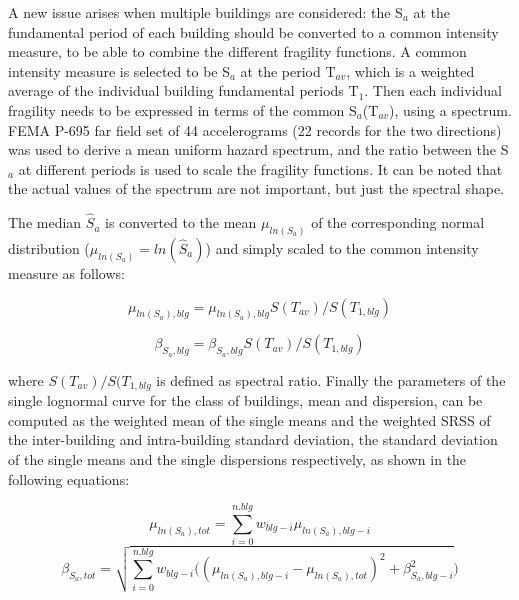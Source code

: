 A new issue arises when multiple buildings are considered: the S$_a$ at the fundamental period of each building should be converted to a common intensity measure, to be able to combine the different fragility functions. A common intensity measure is selected to be S$_a$ at the period T$_{av}$, which is a weighted average of the individual building fundamental periods T$_1$. Then each individual fragility needs to be expressed in terms of the common S$_a$(T$_{av}$), using a spectrum. FEMA P-695 \citep{ATC2007} far field set of 44 accelerograms (22 records for the two directions) was used to derive a mean uniform hazard spectrum, and the ratio between the S$_a$ at different periods is used to scale the fragility functions. It can be noted that the actual values of the spectrum are not important, but just the spectral shape.

The median $\hat{S}_a$ is converted to the mean $\mu_{ln(S_a)}$ of the corresponding normal distribution ($\mu_{ln(S_a)} = ln(\hat{S}_a)$) and simply scaled to the common intensity measure as follows:

\begin{equation}
	\mu_{ln(S_a), blg} = \mu_{ln(S_a), blg} S(T_{av})/ S(T_{1, blg})
\end{equation}

\begin{equation}
	\beta_{S_a, blg} = \beta_{S_a, blg} S(T_{av})/ S(T_{1, blg})
	\label{eq:Sa(Tav)}
\end{equation}

where $S(T_{av})/ S(T_{1, blg}$ is defined as spectral ratio. Finally the parameters of the single lognormal curve for the class of buildings, mean and dispersion, can be computed as the weighted mean of the single means and the weighted SRSS of the inter-building and intra-building standard deviation, the standard deviation of the single means and the single dispersions respectively, as shown in the following equations:

\begin{equation}
\mu_{ln(S_a), tot} = \sum_{i=0}^{n.blg} w_{blg-i} \mu_{ln(S_a), blg-i}
\label{eq:combination-lognormals-mu}
\end{equation}
\begin{equation}
\beta_{S_a, tot} = \sqrt{ \sum_{i=0}^{n.blg} w_{blg-i} ((\mu_{ln(S_a), blg-i}-\mu_{ln(S_a), tot})^2+ \beta_{S_a, blg-i}^2})
\label{eq:combination-lognormals-sigma}
\end{equation}


